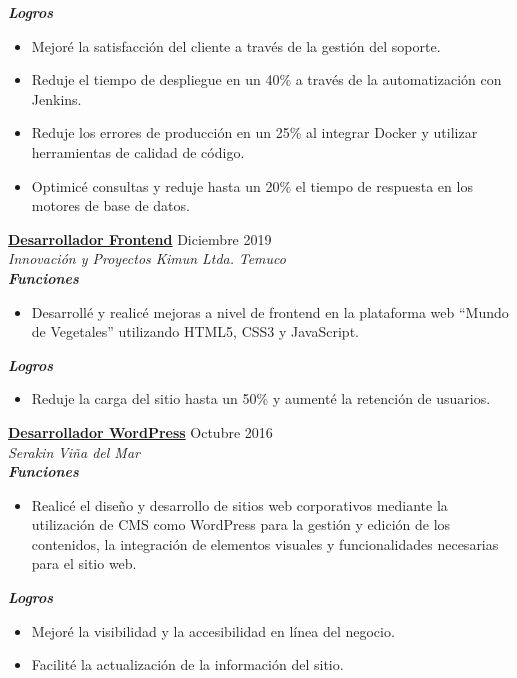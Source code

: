 \documentclass[11pt,a4paper]{article}
\newcommand{\job}[4]{%
    \textbf{\underline{#1}} \hfill #2\\
    \textit{#3} \hfill \textit{#4}\\[2pt]
}
\newcommand{\newsubsection}[1]{
    \vspace{0em}
    \textbf{\textit{#1}}
    \vspace{0em}
}
\begin{document}
\newsubsection{Logros}
\begin{itemize}[leftmargin=*, noitemsep, topsep=2pt]
    \item Mejoré la satisfacción del cliente a través de la gestión del soporte.
    \item Reduje el tiempo de despliegue en un 40\% a través de la automatización con Jenkins.
    \item Reduje los errores de producción en un 25\% al integrar Docker y utilizar herramientas de calidad de código.
    \item Optimicé consultas y reduje hasta un 20\% el tiempo de respuesta en los motores de base de datos.
\end{itemize}

\job{Desarrollador Frontend}{Diciembre 2019}{Innovación y Proyectos Kimun Ltda.}{Temuco}

\newsubsection{Funciones}
\begin{itemize}[leftmargin=*, noitemsep, topsep=2pt]
    \item Desarrollé y realicé mejoras a nivel de frontend en la plataforma web ``Mundo de Vegetales'' utilizando HTML5, CSS3 y JavaScript.
\end{itemize}

\newsubsection{Logros}
\begin{itemize}[leftmargin=*, noitemsep, topsep=2pt]
    \item Reduje la carga del sitio hasta un 50\% y aumenté la retención de usuarios.
\end{itemize}

\job{Desarrollador WordPress}{Octubre 2016}{Serakin}{Viña del Mar}

\newsubsection{Funciones}
\begin{itemize}[leftmargin=*, noitemsep, topsep=2pt]
    \item Realicé el diseño y desarrollo de sitios web corporativos mediante la utilización de CMS como WordPress para la gestión y edición de los contenidos, la integración de elementos visuales y funcionalidades necesarias para el sitio web.
\end{itemize}

\newsubsection{Logros}
\begin{itemize}[leftmargin=*, noitemsep, topsep=2pt]
    \item Mejoré la visibilidad y la accesibilidad en línea del negocio.
    \item Facilité la actualización de la información del sitio.
\end{itemize}
\end{document}
